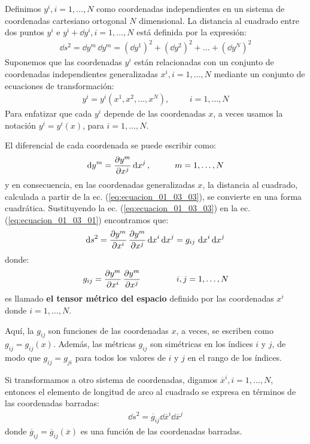 \documentclass[hidelinks,12pt]{article}
\begin{document}
Definimos $y^{i}, i = 1, \ldots, N$ como coordenadas independientes en un sistema de coordenadas cartesiano ortogonal $N$ dimensional. La distancia al cuadrado entre dos puntos $y^{i}$ e $y^{i} + \dd{y}^{i}, i = 1, \ldots, N$ está definida por la expresión:
\begin{align}
\dd{s}^{2} = \dd{y}^{m} \, \dd{y}^{m} = (\dd{y}^{1})^{2} + (\dd{y}^{2})^{2} + \ldots + (\dd{y}^{N})^{2}
\label{eq:ecuacion_01_03_01}
\end{align}
Suponemos que las coordenadas $y^{i}$ están relacionadas con un conjunto de coordenadas independientes generalizadas $x^{i}, i = 1, \ldots, N$ mediante un conjunto de ecuaciones de transformación:
\begin{align}
y^{i} = y^{i} (x^{1}, x^{2}, \ldots, x^{N}), \hspace{1cm} i = 1, \ldots, N
\label{eq:ecuacion_01_03_02}
\end{align}
Para enfatizar que cada $y^{i}$ depende de las coordenadas $x$, a veces usamos la notación $y^{i} = y^{i} (x)$, para $i = 1, \ldots, N$.
\par
El diferencial de cada coordenada se puede escribir como:
\begin{align}
\dd{y}^{m} = \pdv{y^{m}}{x^{j}} \dd{x}^{j}, \hspace{1cm} m = 1, \ldots, N
\label{eq:ecuacion_01_03_03}
\end{align}
y en consecuencia, en las coordenadas generalizadas $x$, la distancia al cuadrado, calculada a partir de la ec. (\ref{eq:ecuacion_01_03_03}), se convierte en una forma cuadrática. Sustituyendo la ec. (\ref{eq:ecuacion_01_03_03}) en la ec. (\ref{eq:ecuacion_01_03_01}) encontramos que:
\begin{align}
\dd{s}^{2} = \pdv{y^{m}}{x^{i}} \, \pdv{y^{m}}{x^{j}} \dd{x}^{i} \dd{x}^{j} = g_{ij} \, \dd{x}^{i} \dd{x}^{j}
\label{eq:ecuacion_01_03_04}
\end{align}
donde:
\begin{align}
g_{ij} = \pdv{y^{m}}{x^{i}} \, \pdv{y^{m}}{x^{j}} \hspace{1.5cm} i, j = 1, \ldots, N
\label{eq:ecuacion_01_03_05}
\end{align}
es llamado \textbf{el tensor métrico del espacio} definido por las coordenadas $x^{i}$ donde $i = 1, \ldots, N$.
\par
Aquí, la $g_{ij}$ son funciones de las coordenadas $x$, a veces, se escriben como $g_{ij} = g_{ij} (x)$. Además, las métricas $g_{ij}$ son simétricas en los índices $i$ y $j$, de modo que $g_{ij} = g_{ji}$ para todos los valores de $i$ y $j$ en el rango de los índices.
\par
Si transformamos a otro sistema de coordenadas, digamos $\overline{x}^{i}, i = 1, \ldots, N$, entonces el elemento de longitud de arco al cuadrado se expresa en términos de las coordenadas barradas:
\begin{align*}
\dd{s}^{2} = \overline{g}_{ij} \dd{\overline{x}}^{i} \dd{\overline{x}}^{j}
\end{align*}
donde $\overline{g}_{ij} = \overline{g}_{ij} (\overline{x})$ es una función de las coordenadas barradas.
\end{document}
